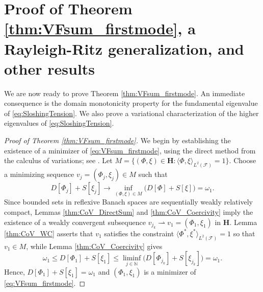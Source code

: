 \documentclass[letterpaper, 12pt]{amsart}
\newcommand{\N}{\mathbb{N}}
\renewcommand{\H}{\mathbf{H}}
\newcommand{\F}{\mathcal{F}}
\begin{document}


\section{Proof of Theorem \ref{thm:VFsum_firstmode}, a Rayleigh-Ritz generalization, and other results} \label{sec:Proof}
We are now ready to prove Theorem \ref{thm:VFsum_firstmode}. An immediate consequence is the domain monotonicity property for the fundamental eigenvalue of \eqref{eq:SloshingTension}. We also prove a variational characterization of the higher eigenvalues of \eqref{eq:SloshingTension}.

\begin{proof}[Proof of Theorem \ref{thm:VFsum_firstmode}]
We begin by establishing the existence of a minimizer of \eqref{eq:VFsum_firstmode}, using the direct method from the calculus of variations; see  \cite[Theorem 2.36]{Rindler:2015aa}. Let $M=\{(\Phi,\xi)\in\H\colon\langle\Phi,\xi\rangle_{L^2(\F)}=1\}$. Choose a minimizing sequence $v_j=(\Phi_j,\xi_j)\in M$ such that
\[ D[\Phi_j]+S[\xi_j]\longrightarrow\inf_{(\Phi,\xi)\in M} \Big(D[\Phi]+S[\xi]\Big) = \omega_1. \]
Since bounded sets in reflexive Banach spaces are sequentially weakly relatively compact, Lemmas \ref{thm:CoV_DirectSum} and \ref{thm:CoV_Coercivity} imply  the existence of a weakly convergent subsequence $v_{j_k}\rightharpoonup v_1=(\Phi_1,\xi_1)$ in $\H$. Lemma \ref{thm:CoV_WC} asserts that $v_1$ satisfies the constraint $\langle\Phi^*,\xi^*\rangle_{L^2(\F)}=1$ so that $v_1\in M$, while Lemma \ref{thm:CoV_Coercivity} gives
\[ \omega_1\le D[\Phi_1] + S[\xi_1]\le\liminf_{j\in\N} \Big(D[\Phi_{j_k}] + S[\xi_{j_k}]\Big) = \omega_1. \]
Hence, $D[\Phi_1]+S[\xi_1]=\omega_1$ and $(\Phi_1,\xi_1)$ is a minimizer of \eqref{eq:VFsum_firstmode}. 


\end{proof}
\end{document}
